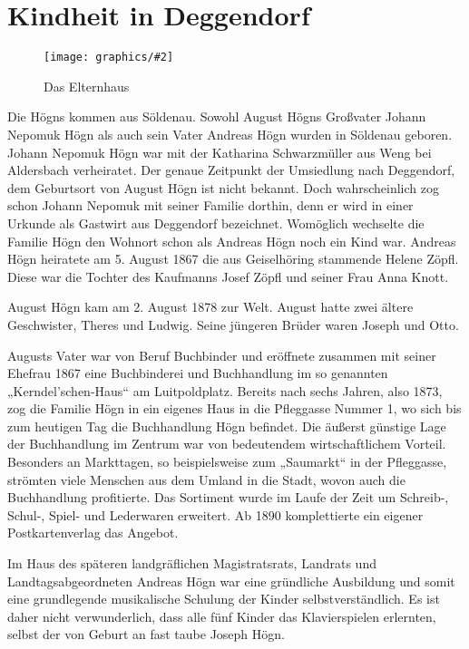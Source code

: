\documentclass{book}
\newcommand{\img}[2][width=\linewidth]{\noindent\texttt{[image: graphics/\#2]}}
\begin{document}
\section{Kindheit in Deggendorf}

\begin{figure}
\img{Das-Elternhaus}
\caption{Das Elternhaus}
\end{figure}

Die Högns kommen aus Söldenau. Sowohl August Högns Großvater Johann
Nepomuk Högn als auch sein Vater Andreas Högn wurden in Söldenau
geboren. Johann Nepomuk Högn war mit der Katharina Schwarzmüller aus
Weng bei Aldersbach verheiratet. Der genaue Zeitpunkt der Umsiedlung
nach Deggendorf, dem Geburtsort von August Högn ist nicht bekannt.
Doch wahrscheinlich zog schon Johann Nepomuk mit seiner Familie
dorthin, denn er wird in einer Urkunde als Gastwirt aus Deggendorf
bezeichnet. Womöglich wechselte die Familie Högn den Wohnort schon als
Andreas Högn noch ein Kind war. Andreas Högn heiratete am 5. August
1867 die aus Geiselhöring stammende Helene Zöpfl. Diese war die Tochter
des Kaufmanns Josef Zöpfl und seiner Frau Anna Knott.

August Högn kam am 2. August 1878 zur Welt. August hatte zwei ältere
Geschwister, Theres und Ludwig. Seine jüngeren Brüder waren Joseph und
Otto.

Augusts Vater war von Beruf Buchbinder und eröffnete zusammen mit seiner
Ehefrau 1867 eine Buchbinderei und Buchhandlung im so genannten
„Kerndel\-’schen-Haus“ am Luitpoldplatz. Bereits nach sechs Jahren, also
1873, zog die Familie Högn in ein eigenes Haus in die Pfleggasse Nummer
1, wo sich bis zum heutigen Tag die Buchhandlung Högn befindet. Die
äußerst günstige Lage der Buchhandlung im Zentrum war von bedeutendem
wirtschaftlichem Vorteil. Besonders an Markttagen, so beispielsweise
zum „Saumarkt“ in der Pfleggasse, strömten viele Menschen aus dem
Umland in die Stadt, wovon auch die Buchhandlung profitierte. Das
Sortiment wurde im Laufe der Zeit um Schreib-, Schul-, Spiel- und
Lederwaren erweitert. Ab 1890 komplettierte ein eigener
Postkartenverlag das Angebot.

Im Haus des späteren landgräflichen Magistratsrats, Landrats und
Landtagsabgeordneten Andreas Högn war eine gründliche Ausbildung und
somit eine grundlegende musikalische Schulung der Kinder
selbstverständlich. Es ist daher nicht verwunderlich, dass alle fünf
Kinder das Klavierspielen erlernten, selbst der von Geburt an fast
taube Joseph Högn.
\end{document}
